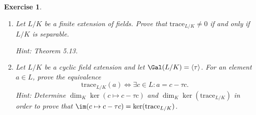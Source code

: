 \documentclass[a4paper,10pt,reqno]{amsart}
\newtheorem{ex}{Exercise}[section]
\begin{document}
\begin{ex}
\label{10.4}~
    \begin{enumerate}[label=(\roman*)]
        \item Let $L/K$ be a finite extension of fields. Prove that $\mathrm{trace}_{L/K} \neq 0$ if and only if $L/K$ is separable.

    \noindent \textit{Hint:} Theorem 5.13.
        \item Let $L/K$ be a cyclic field extension and let $\Gal(L/K) = \left\langle \tau \right\rangle$. For an element $a \in L$, prove the equivalence
        \[
        \mathrm{trace}_{L/K}(a) \Leftrightarrow \exists c \in L: a = c - \tau c.
        \]
        \noindent \textit{Hint:} Determine $\dim_K \ker (c \mapsto c- \tau c)$ and $\dim_K \ker (\mathrm{trace}_{L/K})$ in order to prove that $\im(c \mapsto c - \tau c) = \ker (\mathrm{trace}_{L/K})$.
    \end{enumerate}
\end{ex}
\end{document}
